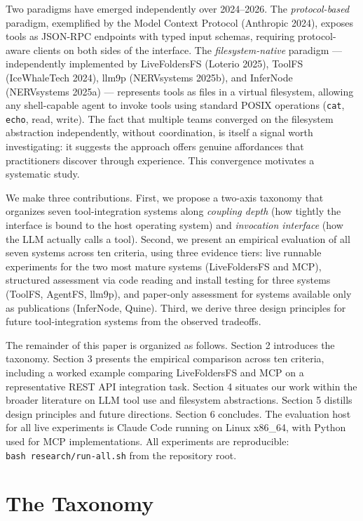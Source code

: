 \documentclass[
  11pt,
]{article}
\begin{document}
Two paradigms have emerged independently over 2024--2026. The
\emph{protocol-based} paradigm, exemplified by the Model Context
Protocol (Anthropic 2024), exposes tools as JSON-RPC endpoints with
typed input schemas, requiring protocol-aware clients on both sides of
the interface. The \emph{filesystem-native} paradigm --- independently
implemented by LiveFoldersFS (Loterio 2025), ToolFS (IceWhaleTech 2024),
llm9p (NERVsystems 2025b), and InferNode (NERVsystems 2025a) ---
represents tools as files in a virtual filesystem, allowing any
shell-capable agent to invoke tools using standard POSIX operations
(\texttt{cat}, \texttt{echo}, read, write). The fact that multiple teams
converged on the filesystem abstraction independently, without
coordination, is itself a signal worth investigating: it suggests the
approach offers genuine affordances that practitioners discover through
experience. This convergence motivates a systematic study.

We make three contributions. First, we propose a two-axis taxonomy that
organizes seven tool-integration systems along \emph{coupling depth}
(how tightly the interface is bound to the host operating system) and
\emph{invocation interface} (how the LLM actually calls a tool). Second,
we present an empirical evaluation of all seven systems across ten
criteria, using three evidence tiers: live runnable experiments for the
two most mature systems (LiveFoldersFS and MCP), structured assessment
via code reading and install testing for three systems (ToolFS, AgentFS,
llm9p), and paper-only assessment for systems available only as
publications (InferNode, Quine). Third, we derive three design
principles for future tool-integration systems from the observed
tradeoffs.

The remainder of this paper is organized as follows. Section 2
introduces the taxonomy. Section 3 presents the empirical comparison
across ten criteria, including a worked example comparing LiveFoldersFS
and MCP on a representative REST API integration task. Section 4
situates our work within the broader literature on LLM tool use and
filesystem abstractions. Section 5 distills design principles and future
directions. Section 6 concludes. The evaluation host for all live
experiments is Claude Code running on Linux x86\_64, with Python used
for MCP implementations. All experiments are reproducible:
\texttt{bash\ research/run-all.sh} from the repository root.

\hypertarget{the-taxonomy}{%
\section{The Taxonomy}\label{the-taxonomy}}
\end{document}
